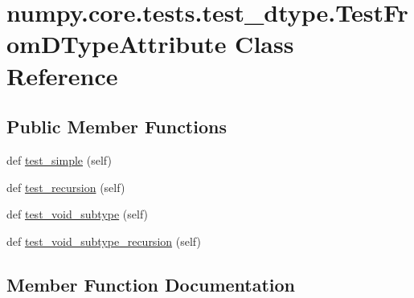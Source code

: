 \hypertarget{classnumpy_1_1core_1_1tests_1_1test__dtype_1_1TestFromDTypeAttribute}{}\section{numpy.\+core.\+tests.\+test\+\_\+dtype.\+Test\+From\+D\+Type\+Attribute Class Reference}
\label{classnumpy_1_1core_1_1tests_1_1test__dtype_1_1TestFromDTypeAttribute}
\subsection*{Public Member Functions}
\begin{DoxyCompactItemize}
\item 
def \hyperlink{classnumpy_1_1core_1_1tests_1_1test__dtype_1_1TestFromDTypeAttribute_ac1f72c0f7774bf58d9d57642216411ec}{test\+\_\+simple} (self)
\item 
def \hyperlink{classnumpy_1_1core_1_1tests_1_1test__dtype_1_1TestFromDTypeAttribute_ae92a810d723ef234694cd292be42c0d2}{test\+\_\+recursion} (self)
\item 
def \hyperlink{classnumpy_1_1core_1_1tests_1_1test__dtype_1_1TestFromDTypeAttribute_a9b868998a4765ca6d3ccda7faf7aa04f}{test\+\_\+void\+\_\+subtype} (self)
\item 
def \hyperlink{classnumpy_1_1core_1_1tests_1_1test__dtype_1_1TestFromDTypeAttribute_addfad5abfc0f6d09432ef76bbe71b3c3}{test\+\_\+void\+\_\+subtype\+\_\+recursion} (self)
\end{DoxyCompactItemize}


\subsection{Member Function Documentation}
\mbox{\label{classnumpy_1_1core_1_1tests_1_1test__dtype_1_1TestFromDTypeAttribute_ae92a810d723ef234694cd292be42c0d2}} 
